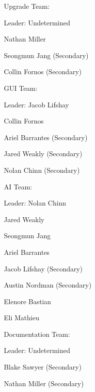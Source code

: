 \begin{DoxyEnumerate}
\item Upgrade Team\+:
\begin{DoxyItemize}
\item Leader\+: Undetermined
\item Nathan Miller
\item Seongmun Jang (Secondary)
\item Collin Fornos (Secondary)
\end{DoxyItemize}
\item G\+U\+I Team\+:
\begin{DoxyItemize}
\item Leader\+: Jacob Lifshay
\item Collin Fornos
\item Ariel Barrantes (Secondary)
\item Jared Weakly (Secondary)
\item Nolan Chinn (Secondary)
\end{DoxyItemize}
\item A\+I Team\+:
\begin{DoxyItemize}
\item Leader\+: Nolan Chinn
\item Jared Weakly
\item Seongmun Jang
\item Ariel Barrantes
\item Jacob Lifshay (Secondary)
\item Austin Nordman (Secondary)
\item Elenore Bastian
\item Eli Mathieu
\end{DoxyItemize}
\item Documentation Team\+:
\begin{DoxyItemize}
\item Leader\+: Undetermined
\item Blake Sawyer (Secondary)
\item Nathan Miller (Secondary) 
\end{DoxyItemize}
\end{DoxyEnumerate}
